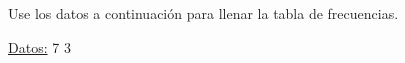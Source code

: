\documentclass{cdplf-prueba}
\begin{document}
\subsection{}

Use los datos a continuación para llenar la tabla de frecuencias.

\underline{Datos:} \hspace{4pt} 7 \hspace{4pt}\textbullet\hspace{4pt} 3 \hspace{4pt}\textbullet
\end{document}
